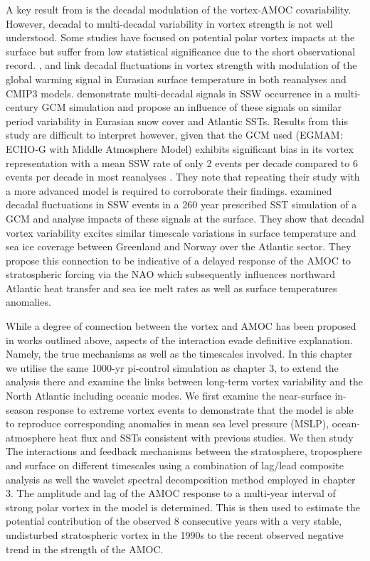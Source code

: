 A key result from \cite{reichlerStratospheric2012b} is the decadal modulation of the vortex-AMOC covariability. However, decadal to multi-decadal variability in vortex strength is not well understood. Some studies have focused on potential polar vortex impacts at the surface but suffer from low statistical significance due to the short observational record. \cite{garfinkelStratospheric2017b}, \cite{garfinkelEffect2015b} and \cite{cohenDecadal2009b} link decadal fluctuations in vortex strength with modulation of the global warming signal in Eurasian surface temperature in both reanalyses and CMIP3 models. \cite{schimankeMultidecadal2011b} demonstrate multi-decadal signals in SSW occurrence in a multi-century GCM simulation and propose an influence of these signals on similar period variability in Eurasian snow cover and Atlantic SSTs. Results from this study are difficult to interpret however, given that the GCM used (EGMAM: ECHO‐G with Middle Atmosphere Model) exhibits significant bias in its vortex representation with a mean SSW rate of only 2 events per decade compared to 6 events per decade in most reanalyses \citep{ayarzaguenaRepresentation2019a}. They note that repeating their study with a more advanced model is required to corroborate their findings. \cite{manziniStratospheretroposphere2012b} examined decadal fluctuations in SSW events in a 260 year prescribed SST simulation of a GCM and analyse impacts of these signals at the surface. They show that decadal vortex variability excites similar timescale variations in surface temperature and sea ice coverage between Greenland and Norway over the Atlantic sector. They propose this connection to be indicative of a delayed response of the AMOC to stratospheric forcing via the NAO which  subsequently influences northward Atlantic heat transfer and sea ice melt rates as well as surface temperatures anomalies. 

While a degree of connection between the vortex and AMOC has been proposed in works outlined above, aspects of the interaction evade definitive explanation. Namely, the true mechanisms as well as the timescales involved. In this chapter we utilise the same 1000-yr pi-control simulation as chapter 3, to extend the analysis there and examine the links between long-term vortex variability and the North Atlantic including oceanic modes. We first examine the near-surface in-season response to extreme vortex events to demonstrate that the model is able to reproduce corresponding anomalies in mean sea level pressure (MSLP), ocean-atmosphere heat flux and SSTs consistent with previous studies. We then study The interactions and feedback mechanisms between the stratosphere, troposphere and surface on different timescales using a combination of lag/lead composite analysis as well the wavelet spectral decomposition method employed in chapter 3. The amplitude and lag of the AMOC response to a multi-year interval of strong polar vortex in the model is determined. This is then used to estimate the potential contribution of the observed 8 consecutive years with a very stable, undisturbed stratospheric vortex in the 1990s \citep{pawsonCold1999} to the recent observed negative trend in the strength of the AMOC.

